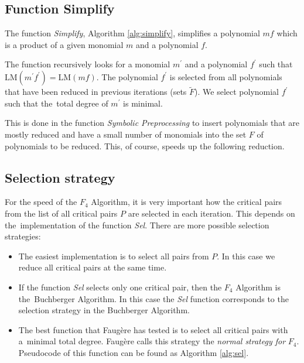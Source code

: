 

\subsection{Function Simplify}
The function \textit{Simplify}, Algorithm \ref{alg:simplify}, simplifies a polynomial $m f$ which is a product of a given monomial $m$ and a polynomial $f$.

The function recursively looks for a monomial $m^\prime$ and a polynomial $f^\prime$ such that $\textrm{LM}(m^\prime f^\prime) = \textrm{LM}(m f)$. The polynomial $f^\prime$ is selected from all polynomials that have been reduced in previous iterations (sets $\tilde{F}$). We select polynomial $f^\prime$ such that the~total degree of $m^\prime$ is minimal.

This is done in the function \textit{Symbolic Preprocessing} to insert polynomials that are mostly reduced and have a small number of monomials into the set $F$ of polynomials to be reduced. This, of course, speeds up the following reduction.



\subsection{Selection strategy}
\label{subsec:F4:sel}
For the speed of the $F_4$ Algorithm, it is very important how the critical pairs from the list of all critical pairs $P$ are selected in each iteration. This depends on the~implementation of the function \textit{Sel}. There are more possible selection strategies:

\begin{itemize}
  \item The easiest implementation is to select all pairs from $P$. In this case we reduce all critical pairs at the same time.
  \item If the function \textit{Sel} selects only one critical pair, then the $F_4$ Algorithm is the~Buchberger Algorithm. In this case the \textit{Sel} function corresponds to the selection strategy in the Buchberger Algorithm.
  \item The best function that Faug\`ere has tested is to select all critical pairs with a~minimal total degree. Faug\`ere calls this strategy the \textit{normal strategy for} $F_4$. Pseudocode of this function can be found as Algorithm \ref{alg:sel}.
\end{itemize}

